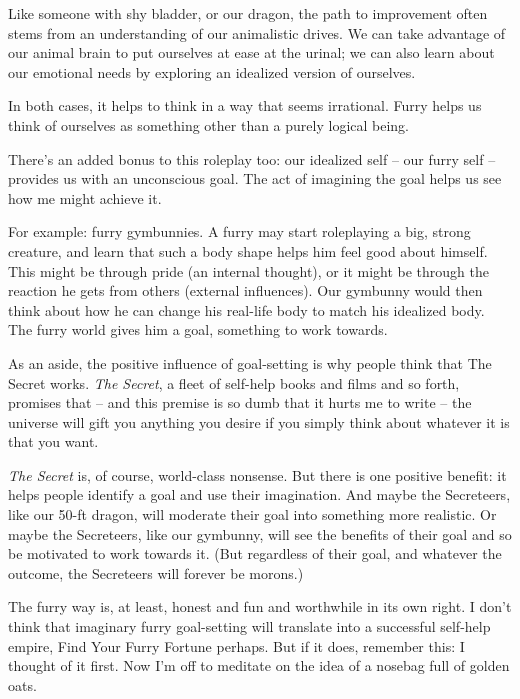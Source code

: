 Like someone with shy bladder, or our dragon, the path to improvement often stems from an understanding of our animalistic drives. We can take advantage of our animal brain to put ourselves at ease at the urinal; we can also learn about our emotional needs by exploring an idealized version of ourselves.

In both cases, it helps to think in a way that seems irrational. Furry helps us think of ourselves as something other than a purely logical being.

There's an added bonus to this roleplay too: our idealized self -- our furry self -- provides us with an unconscious goal. The act of imagining the goal helps us see how me might achieve it.

For example: furry gymbunnies. A furry may start roleplaying a big, strong creature, and learn that such a body shape helps him feel good about himself. This might be through pride (an internal thought), or it might be through the reaction he gets from others (external influences). Our gymbunny would then think about how he can change his real-life body to match his idealized body. The furry world gives him a goal, something to work towards.

As an aside, the positive influence of goal-setting is why people think that The Secret works. \textit{The Secret}, a fleet of self-help books and films and so forth, promises that -- and this premise is so dumb that it hurts me to write -- the universe will gift you anything you desire if you simply think about whatever it is that you want.

\textit{The Secret} is, of course, world-class nonsense. But there is one positive benefit: it helps people identify a goal and use their imagination. And maybe the Secreteers, like our 50-ft dragon, will moderate their goal into something more realistic. Or maybe the Secreteers, like our gymbunny, will see the benefits of their goal and so be motivated to work towards it. (But regardless of their goal, and whatever the outcome, the Secreteers will forever be morons.)

The furry way is, at least, honest and fun and worthwhile in its own right. I don't think that imaginary furry goal-setting will translate into a successful self-help empire, Find Your Furry Fortune perhaps. But if it does, remember this: I thought of it first. Now I'm off to meditate on the idea of a nosebag full of golden oats.
